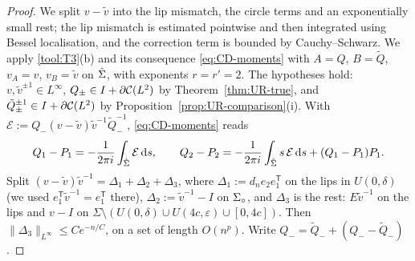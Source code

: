 \begin{proof}
We split $v-\tilde v$ into the lip mismatch, the circle terms and an exponentially small rest; the lip mismatch
is estimated pointwise and then integrated using Bessel localisation, and the correction term is bounded by
Cauchy--Schwarz. We apply \ref{tool:T3}(b) and its consequence \eqref{eq:CD-moments} with $A=Q$, $B=\tilde Q$, $v_A=v$, $v_B=\tilde v$ on
$\hat\Sigma$, with exponents $r=r'=2$. The hypotheses hold: $v,\tilde v^{\pm1}\in L^\infty$, $Q_\pm\in I+\partial\mathcal{C}(L^2)$ by
Theorem~\ref{thm:UR-true}, and $\tilde Q_\pm^{\pm1}\in I+\partial\mathcal{C}(L^2)$ by Proposition~\ref{prop:UR-comparison}(i). With
$\mathcal E:=Q_-(v-\tilde v)\tilde v^{-1}\tilde Q_-^{-1}$, \eqref{eq:CD-moments} reads
\[
  Q_1-P_1=-\frac1{2\pi i}\int_{\hat\Sigma}\mathcal E\,\mathrm{d} s,\qquad
  Q_2-P_2=-\frac1{2\pi i}\int_{\hat\Sigma}s\,\mathcal E\,\mathrm{d} s+(Q_1-P_1)P_1 .
\]
Split $(v-\tilde v)\tilde v^{-1}=\Delta_1+\Delta_2+\Delta_3$, where $\Delta_1:=d_ne_2e_1^{\mathsf T}$ on the lips in
$U(0,\delta)$ (we used $e_1^{\mathsf T}\tilde v^{-1}=e_1^{\mathsf T}$ there), $\Delta_2:=\tilde v^{-1}-I$ on $\Sigma_{\circ}$, and
$\Delta_3$ is the rest: $E\tilde v^{-1}$ on the lips and $v-I$ on $\Sigma\setminus(U(0,\delta)\cup U(4c,\varepsilon)
\cup[0,4c])$. Then $\|\Delta_3\|_{L^\infty}\le Ce^{-n/C}$, on a set of length $O(n^p)$. Write $Q_-=\tilde Q_-+(Q_--\tilde
Q_-)$.


\end{proof}
